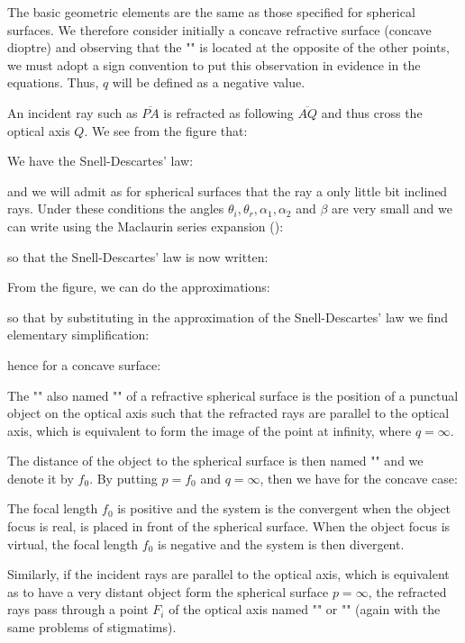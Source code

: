 	The basic geometric elements are the same as those specified for spherical surfaces. We therefore consider initially a concave refractive surface (concave dioptre) and observing that the "" is located at the opposite of the other points, we must adopt a sign convention to put this observation in evidence in the equations. Thus, $q$ will be defined as a negative value.

	An incident ray such as $\overline{PA}$ is refracted as following $\overline{AQ}$ and thus cross the optical axis $Q$. We see from the figure that:
	
	We have the Snell-Descartes' law:
	
	and we will admit as for spherical surfaces that the ray a only little bit inclined rays. Under these conditions the angles $\theta_i,\theta_r,\alpha_1,\alpha_2$ and $\beta$ are very small and we can write using the Maclaurin series expansion ():
	
	so that the Snell-Descartes' law is now written:
	
	From the figure, we can do the approximations:
	
	so that by substituting in the approximation of the Snell-Descartes' law we find elementary simplification:
	
	hence for a concave surface:
	
	The "" also named "" of a refractive spherical surface is the position of a punctual object on the optical axis such that the refracted rays are parallel to the optical axis, which is equivalent to form the image of the point at infinity, where $q=\infty$.

	The distance of the object to the spherical surface is then named "" and we denote it by $f_0$. By putting $p=f_0$ and $q=\infty$, then we have for the concave  case:
	
	The focal length $f_0$ is positive and the system is the convergent when the object focus is real, is placed in front of the spherical surface. When the object focus is virtual, the focal length $f_0$ is negative and the system is then divergent.
	
	Similarly, if the incident rays are parallel to the optical axis, which is equivalent as to have a very distant object form the spherical surface $p=\infty$, the refracted rays pass through a point $F_i$ of the optical axis named "" or "" (again with the same problems of stigmatims).
	
